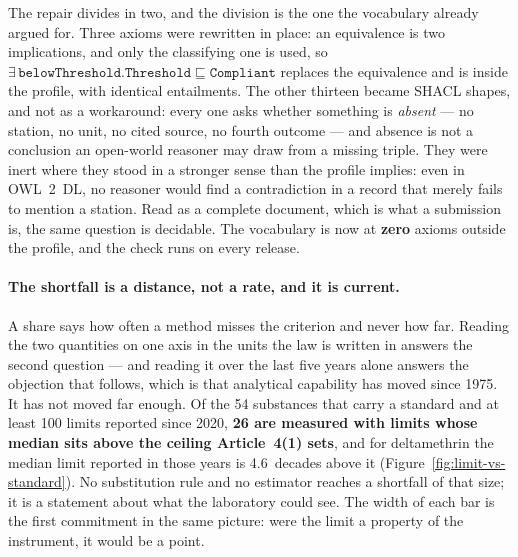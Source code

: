 The repair divides in two, and the division is the one the vocabulary already
argued for. Three axioms were rewritten in place: an equivalence is two
implications, and only the classifying one is used, so
$\exists\,\texttt{belowThreshold}.\texttt{Threshold} \sqsubseteq
\texttt{Compliant}$ replaces the equivalence and is inside the profile, with
identical entailments. The other thirteen became
SHACL shapes, and not as a workaround: every one asks whether something is
\emph{absent} --- no station, no unit, no cited source, no fourth outcome ---
and absence is not a conclusion an open-world reasoner may draw from a missing
triple. They were inert where they stood in a stronger sense than the profile
implies: even in OWL~2~DL, no reasoner would find a contradiction in a record
that merely fails to mention a station. Read as a complete document, which is
what a submission is, the same question is decidable. The vocabulary is now at
\textbf{zero} axioms outside the profile, and the check runs on every release.

\paragraph{The shortfall is a distance, not a rate, and it is current.}
A share says how often a method misses the criterion and never how far. Reading
the two quantities on one axis in the units the law is written
in answers the second question ---
and reading it over the last five years alone answers the objection that
follows, which is that analytical capability has moved since \num{1975}. It
has not moved far enough. Of the \num{54} substances that carry a standard and
at least \num{100} limits reported since \num{2020},
\textbf{\num{26} are measured with limits whose median sits above the ceiling
Article~4(1) sets}, and for deltamethrin the median limit reported in those
years is \num{4.6}~decades above it (Figure~\ref{fig:limit-vs-standard}). No
substitution rule and no estimator reaches a shortfall of that size; it is a
statement about what the laboratory could see. The width of each bar is the
first commitment in the same picture: were the limit a property of the
instrument, it would be a point.

